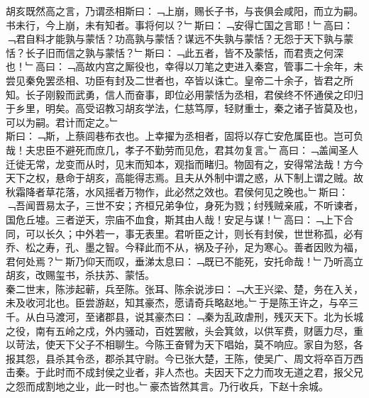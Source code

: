 胡亥既然高之言，乃谓丞相斯曰：﹁上崩，赐长子书，与丧俱会咸阳，而立为嗣。书未行，今上崩，未有知者。事将何以？﹂斯曰：﹁安得亡国之言耶！﹂高曰：﹁君自料才能孰与蒙恬？功高孰与蒙恬？谋远不失孰与蒙恬？无怨于天下孰与蒙恬？长子旧而信之孰与蒙恬？﹂斯曰：﹁此五者，皆不及蒙恬，而君责之何深也！﹂高曰：﹁高故内宫之厮役也，幸得以刀笔之吏进入秦宫，管事二十余年，未尝见秦免罢丞相、功臣有封及二世者也，卒皆以诛亡。皇帝二十余子，皆君之所知。长子刚毅而武勇，信人而奋事，即位必用蒙恬为丞相，君侯终不怀通侯之印归于乡里，明矣。高受诏教习胡亥学法，仁慈笃厚，轻财重士，秦之诸子皆莫及也，可以为嗣。君计而定之。﹂\\
斯曰：﹁斯，上蔡闾巷布衣也。上幸擢为丞相者，固将以存亡安危属臣也。岂可负哉！夫忠臣不避死而庶几，孝子不勤劳而见危，君其勿复言。﹂高曰：﹁盖闻圣人迁徙无常，龙变而从时，见末而知本，观指而睹归。物固有之，安得常法哉！方今天下之权，悬命于胡亥，高能得志焉。且夫从外制中谓之惑，从下制上谓之贼。故秋霜降者草花落，水风摇者万物作，此必然之效也。君侯何见之晚也。﹂斯曰：﹁吾闻晋易太子，三世不安；齐桓兄弟争位，身死为戮；纣残贼亲戚，不听谏者，国危丘墟。三者逆天，宗庙不血食，斯其由人哉！安足与谋！﹂高曰：﹁上下合同，可以长久；中外若一，事无表里。君听臣之计，则长有封侯，世世称孤，必有乔、松之寿，孔、墨之智。今释此而不从，祸及子孙，足为寒心。善者因败为福，君何处焉？﹂斯乃仰天而叹，垂涕太息曰：﹁既已不能死，安托命哉！﹂乃听高立胡亥，改赐玺书，杀扶苏、蒙恬。
\\
秦二世末，陈涉起蕲，兵至陈。张耳、陈余说涉曰：﹁大王兴梁、楚，务在入关，未及收河北也。臣尝游赵，知其豪杰，愿请奇兵略赵地。﹂于是陈王许之，与卒三千。从白马渡河，至诸郡县，说其豪杰曰：﹁秦为乱政虐刑，残灭天下。北为长城之役，南有五岭之戍，外内骚动，百姓罢敝，头会箕敛，以供军费，财匮力尽，重以苛法，使天下父子不相聊生。今陈王奋臂为天下唱始，莫不响应。家自为怒，各报其怨，县杀其令丞，郡杀其守尉。今已张大楚，王陈，使吴广、周文将卒百万西击秦。于此时而不成封侯之业者，非人杰也。夫因天下之力而攻无道之君，报父兄之怨而成割地之业，此一时也。﹂豪杰皆然其言。乃行收兵，下赵十余城。
\\

